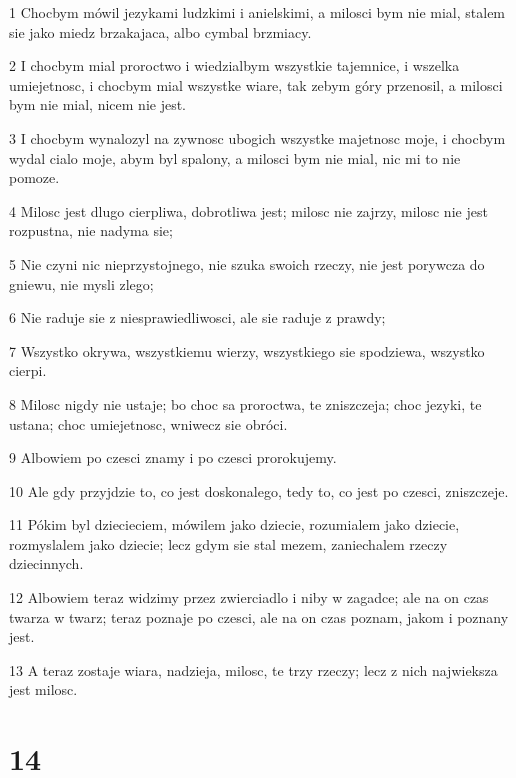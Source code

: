 \par 1 Chocbym mówil jezykami ludzkimi i anielskimi, a milosci bym nie mial, stalem sie jako miedz brzakajaca, albo cymbal brzmiacy.
\par 2 I chocbym mial proroctwo i wiedzialbym wszystkie tajemnice, i wszelka umiejetnosc, i chocbym mial wszystke wiare, tak zebym góry przenosil, a milosci bym nie mial, nicem nie jest.
\par 3 I chocbym wynalozyl na zywnosc ubogich wszystke majetnosc moje, i chocbym wydal cialo moje, abym byl spalony, a milosci bym nie mial, nic mi to nie pomoze.
\par 4 Milosc jest dlugo cierpliwa, dobrotliwa jest; milosc nie zajrzy, milosc nie jest rozpustna, nie nadyma sie;
\par 5 Nie czyni nic nieprzystojnego, nie szuka swoich rzeczy, nie jest porywcza do gniewu, nie mysli zlego;
\par 6 Nie raduje sie z niesprawiedliwosci, ale sie raduje z prawdy;
\par 7 Wszystko okrywa, wszystkiemu wierzy, wszystkiego sie spodziewa, wszystko cierpi.
\par 8 Milosc nigdy nie ustaje; bo choc sa proroctwa, te zniszczeja; choc jezyki, te ustana; choc umiejetnosc, wniwecz sie obróci.
\par 9 Albowiem po czesci znamy i po czesci prorokujemy.
\par 10 Ale gdy przyjdzie to, co jest doskonalego, tedy to, co jest po czesci, zniszczeje.
\par 11 Pókim byl dziecieciem, mówilem jako dziecie, rozumialem jako dziecie, rozmyslalem jako dziecie; lecz gdym sie stal mezem, zaniechalem rzeczy dziecinnych.
\par 12 Albowiem teraz widzimy przez zwierciadlo i niby w zagadce; ale na on czas twarza w twarz; teraz poznaje po czesci, ale na on czas poznam, jakom i poznany jest.
\par 13 A teraz zostaje wiara, nadzieja, milosc, te trzy rzeczy; lecz z nich najwieksza jest milosc.

\chapter{14}

